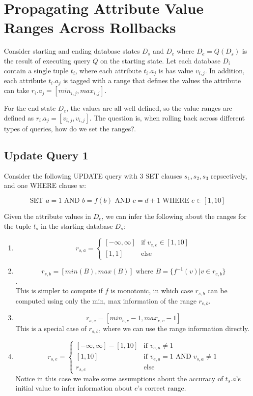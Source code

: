 \documentclass{article}
\begin{document}
\section{Propagating Attribute Value Ranges Across Rollbacks}

Consider starting and ending database states $D_s$ and $D_e$ where
$D_e = Q(D_s)$ is the result of executing query $Q$ on the starting
state.  Let each database $D_i$ contain a single tuple $t_i$, where
each attribute $t_i.a_j$ is has value $v_{i,j}$.  In addition, each
attribute $t_i.a_j$ is tagged with a range that defines the values
the attribute can take $r_i.a_j = [min_{i,j}, max_{i,j}]$.

For the end state $D_e$, the values are all well defined, so the value ranges are
defined as $r_i.a_j = [v_{i,j}, v_{i,j}]$.  The question is, when rolling back
across different types of queries, how do we set the ranges?.

\subsection{Update Query 1}

Consider the following UPDATE query with 3 SET clauses $s_1, s_2, s_3$ repsectively,
and one WHERE clause $w$:

\[
\text{SET } a=1 \text{ AND } b=f(b) \text{ AND } c=d+1 \text{ WHERE } e \in [1, 10] 
\]

Given the attribute values in $D_e$, we can infer the following
about the ranges for the tuple $t_s$ in the starting database $D_s$:

\begin{enumerate}
\item \[r_{s,a} = \begin{cases}
[-\infty, \infty] & \mbox{if } v_{e,e} \in [1, 10]\\
[1, 1]            & \text{else}
\end{cases}\]
\item $$r_{s,b} = [min(B), max(B)] \mbox{ where } B = \{ f^{-1}(v) | v \in r_{e,b} \}$$.\\
      This is simpler to compute if $f$ is monotonic, in which case $r_{s,b}$ can be computed 
      using only the min, max information of the range $r_{e,b}$.
\item $$r_{s,c} = [min_{e,c}-1, max_{e,c}-1]$$
      This is a special case of $r_{s,b}$, where we can use the range information directly.
\item \[r_{s,e} = \begin{cases}
[-\infty, \infty] - [1,10] & \mbox{if } v_{e,a} \ne 1\\
[1,10]                     & \mbox{if } v_{e,a} = 1 \mbox{ AND } v_{s,a} \ne 1\\
r_{s,e}                    & \mbox{else }
\end{cases}
\]
Notice in this case we make some assumptions about the accuracy of $t_s.a$'s initial value to infer
information about $e$'s correct range.
\end{enumerate}
\end{document}
